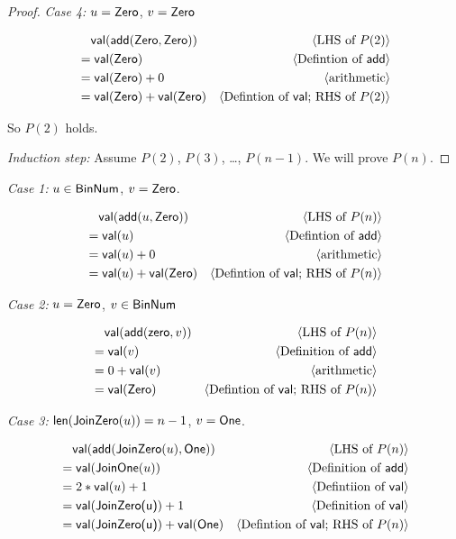 \documentclass[11pt,fleqn]{article}
\newcommand{\mname}[1]{\mbox{\sf #1}}
\newcommand{\pnote}[1]{{\langle \text{#1} \rangle}}
\begin{document}
\begin{proof}
  \emph{Case 4:}
  $u = \mname{Zero}$, $v = \mname{Zero}$

  \begin{align*}
    &\phantom{{}=} \mname{val}(\mname{add}(\mname{Zero}, \mname{Zero})) & \pnote{LHS of $P(2)$}\\
    &= \mname{val}(\mname{Zero}) & \pnote{Defintion of $\mname{add}$}\\
    &= \mname{val}(\mname{Zero}) + 0 & \pnote{arithmetic}\\
    &= \mname{val}(\mname{Zero}) + \mname{val}(\mname{Zero}) &\pnote{Defintion of $\mname{val}$; RHS of $P(2)$}
  \end{align*}

  So $P(2)$ holds.

  \medskip

  \emph{Induction step:}
  Assume $P(2)$, $P(3)$, \dots, $P(n-1)$. We will prove $P(n)$.
  \end{proof}

  \emph{Case 1:}
  $u \in \mname{BinNum}$, $v = \mname{Zero}$.

  \begin{align*}
    &\phantom{{}=} \mname{val}(\mname{add}(u, \mname{Zero})) &\pnote{LHS of $P(n)$}\\
    &= \mname{val}(u) & \pnote{Defintion of $\mname{add}$}\\
    &= \mname{val}(u) + 0 & \pnote{arithmetic}\\
    &= \mname{val}(u) + \mname{val}(\mname{Zero}) & \pnote{Defintion of $\mname{val}$; RHS of $P(n)$}\\
  \end{align*}

  \emph{Case 2:}
  $u = \mname{Zero}$, $v \in \mname{BinNum}$

  \begin{align*}
    &\phantom{{}=} \mname{val}(\mname{add}(\mname{zero}, v)) & \pnote{LHS of $P(n)$}\\
    &= \mname{val}(v) & \pnote{Definition of $\mname{add}$}\\
    &= 0 + \mname{val}(v) & \pnote{arithmetic}\\
    &= \mname{val}(\mname{Zero})  & \pnote{Defintion of $\mname{val}$; RHS of $P(n)$}
  \end{align*}

  \emph{Case 3:}
  $\mname{len}(\mname{JoinZero}(u)) = n - 1$, $v = \mname{One}$.

  \begin{align*}
    &\phantom{{}=} \mname{val}(\mname{add}(\mname{JoinZero}(u), \mname{One})) &\pnote{LHS of $P(n)$}\\
    &= \mname{val}(\mname{JoinOne}(u)) & \pnote{Definition of $\mname{add}$}\\
    &= 2 * \mname{val}(u) + 1 & \pnote{Defintiion of $\mname{val}$}\\
    &= \mname{val}(\mname{JoinZero(u)}) + 1 & \pnote{Definition of $\mname{val}$}\\
    &= \mname{val}(\mname{JoinZero(u)}) + \mname{val}(\mname{One}) & \pnote{Defintion of $\mname{val}$; RHS of $P(n)$}
  \end{align*}
\end{document}
